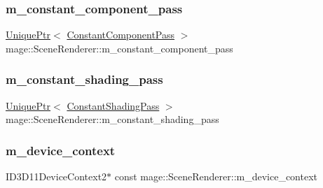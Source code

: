 \hypertarget{classmage_1_1_scene_renderer_a34006a25d67bbe2aa4f25a61dee8cd2f}{}\label{classmage_1_1_scene_renderer_a34006a25d67bbe2aa4f25a61dee8cd2f} 
\subsubsection{\texorpdfstring{m\+\_\+constant\+\_\+component\+\_\+pass}{m\_constant\_component\_pass}}
{\footnotesize\ttfamily \hyperlink{namespacemage_a3316d7143a973e37adf1110f2e80ca31}{Unique\+Ptr}$<$ \hyperlink{classmage_1_1_constant_component_pass}{Constant\+Component\+Pass} $>$ mage\+::\+Scene\+Renderer\+::m\+\_\+constant\+\_\+component\+\_\+pass\hspace{0.3cm}{\ttfamily [private]}}

\hypertarget{classmage_1_1_scene_renderer_a2e98538d6add0603a2da5b949aa26953}{}\label{classmage_1_1_scene_renderer_a2e98538d6add0603a2da5b949aa26953} 
\subsubsection{\texorpdfstring{m\+\_\+constant\+\_\+shading\+\_\+pass}{m\_constant\_shading\_pass}}
{\footnotesize\ttfamily \hyperlink{namespacemage_a3316d7143a973e37adf1110f2e80ca31}{Unique\+Ptr}$<$ \hyperlink{classmage_1_1_constant_shading_pass}{Constant\+Shading\+Pass} $>$ mage\+::\+Scene\+Renderer\+::m\+\_\+constant\+\_\+shading\+\_\+pass\hspace{0.3cm}{\ttfamily [private]}}

\hypertarget{classmage_1_1_scene_renderer_a163ff32807bea62e11fa06c5adf2a291}{}\label{classmage_1_1_scene_renderer_a163ff32807bea62e11fa06c5adf2a291} 
\subsubsection{\texorpdfstring{m\+\_\+device\+\_\+context}{m\_device\_context}}
{\footnotesize\ttfamily I\+D3\+D11\+Device\+Context2$\ast$ const mage\+::\+Scene\+Renderer\+::m\+\_\+device\+\_\+context\hspace{0.3cm}{\ttfamily [private]}}

